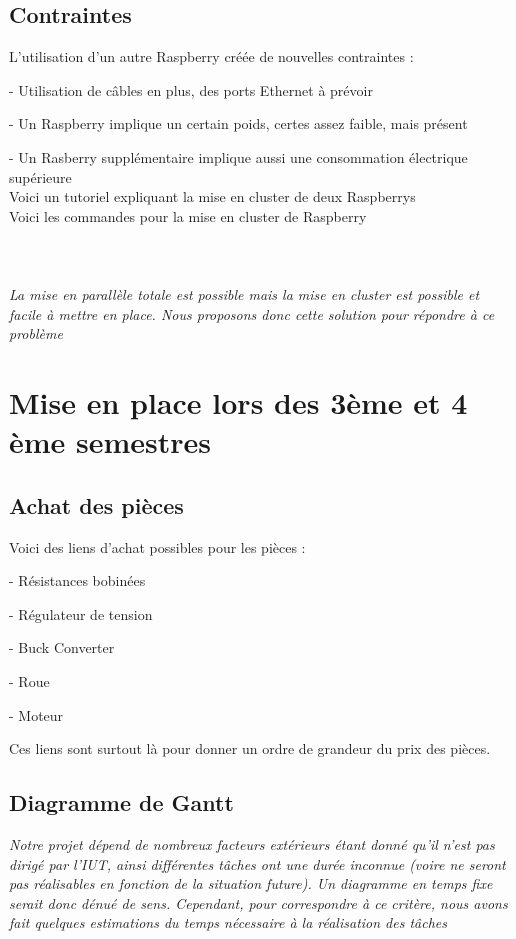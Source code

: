 \documentclass{PackagerQualityN}
\begin{document}
\subsection{Contraintes}
L'utilisation d'un autre Raspberry créée de nouvelles contraintes :

- Utilisation de câbles en plus, des ports Ethernet à prévoir

- Un Raspberry implique un certain poids, certes assez faible, mais présent

- Un Rasberry supplémentaire implique aussi une consommation électrique supérieure
\\
Voici un tutoriel expliquant la mise en cluster de deux Raspberrys \citep{videoGraven}
\\
Voici les commandes pour la mise en cluster de Raspberry \citep{commandeCluster}
\\\\\\
\paragraph{}
\textit{La mise en parallèle totale est possible mais la mise en cluster est possible et facile à mettre en place. Nous proposons donc cette solution pour répondre à ce problème}

\newp       %

\section{Mise en place lors des 3ème et 4 ème semestres}

\subsection{Achat des pièces}
Voici des liens d'achat possibles pour les pièces :

- Résistances bobinées \citep{lienResistance}

- Régulateur de tension \citep{lienRegulateur}

- Buck Converter \citep{buck}

- Roue \citep{lienRoue}

- Moteur \citep{lienMoteur}

Ces liens sont surtout là pour donner un ordre de grandeur du prix des pièces.

\subsection{Diagramme de Gantt}
\textit{Notre projet dépend de nombreux facteurs extérieurs étant donné qu'il n'est pas dirigé par l'IUT, ainsi différentes tâches ont une durée inconnue (voire ne seront pas réalisables en fonction de la situation future). Un diagramme en temps fixe serait donc dénué de sens. Cependant, pour correspondre à ce critère, nous avons fait quelques estimations du temps nécessaire à la réalisation des tâches}
\end{document}
